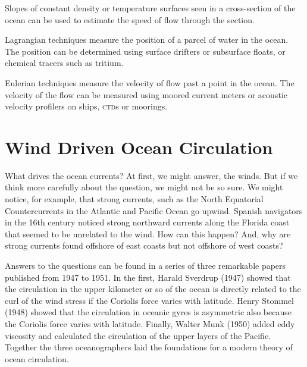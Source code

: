 \begin{enumerate}
\vitem Slopes of constant density or temperature surfaces seen in a
cross-section of the ocean can be used to estimate the speed of flow
through the section.

\vitem Lagrangian techniques measure the position of a parcel of water
in the ocean. The position can be determined using surface drifters or
subsurface floats, or chemical tracers such as
tritium.

\vitem Eulerian techniques measure the velocity of flow past a point
in the ocean.  The velocity of the flow can be measured using moored
current meters or acoustic velocity profilers on ships,
\textsc{ctd}s or moorings.
\end{enumerate}


\chapter{Wind Driven Ocean Circulation} 
What drives the ocean currents? At first, we might answer, the
winds. But if we think more carefully about the question, we might not
be so sure. We might notice, for example, that strong currents, such
as the North Equatorial Countercurrents in the Atlantic and Pacific
Ocean go upwind. Spanish navigators in the 16th century noticed strong
northward currents along the Florida coast that seemed to be unrelated
to the wind. How can this happen? And, why are strong currents found
offshore of east coasts but not offshore of west coasts?

Answers to the questions can be found in a series of three remarkable
papers published from 1947 to 1951. In the first, Harald Sverdrup
(1947) showed that the circulation in the upper kilometer or so of the
ocean is directly related to the curl of the wind stress if the Coriolis force varies with latitude. Henry
Stommel (1948) showed that the circulation in oceanic gyres is
asymmetric also because the Coriolis force varies with
latitude. Finally, Walter Munk (1950) added eddy viscosity and
calculated the circulation of the upper layers of the
Pacific. Together the three oceanographers laid the foundations for a
modern theory of ocean circulation.

